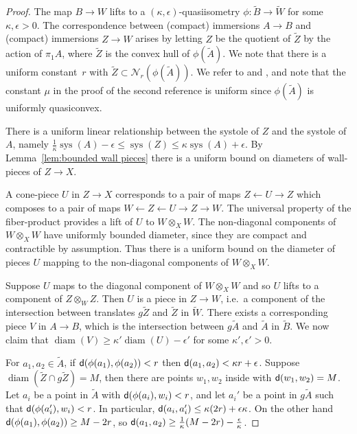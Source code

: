 \documentclass[12pt,oneside]{amsart}
\theoremstyle{definition}
\theoremstyle{definition}
\theoremstyle{remark}
\newcommand{\dist}{\textup{\textsf{d}}}
\DeclareMathOperator{\diam}{\text{diam}}
\newcommand{\neb}{\mathcal N}
\DeclareMathOperator{\sys}{\mathrm sys}
\begin{document}
\begin{proof}
The map $B\rightarrow W$ lifts to a $(\kappa,\epsilon)$-quasiisometry $\phi: \widetilde B\rightarrow \widetilde W$
for some $\kappa,\epsilon>0$.
%
The correspondence between (compact) immersions $A\rightarrow B$ and (compact) immersions $Z\rightarrow W$
arises by letting  $Z$ be the quotient of $\widetilde Z$ by the action of $\pi_1A$, where $\widetilde Z $ is the convex hull of $\phi(\widetilde A)$.
We note that there is a uniform constant~$r$ with $\widetilde Z\subset \neb_r(\phi(\widetilde A))$.
We refer to  \cite[Thm~2.28]{HaglundGraphProduct} and \cite[Prop~3.3]{SageevWiseCores},
and note that the constant $\mu$ in the proof of the second reference is uniform since $\phi(\widetilde A)$ is uniformly quasiconvex. 

There is a uniform linear relationship between the systole of $Z$ and the systole of $A$, namely $\frac {1}{\kappa} \sys(A)- \epsilon \leq \sys (Z)\leq \kappa\sys(A)+\epsilon$.
%
By Lemma~\ref{lem:bounded wall pieces} there is a uniform bound on diameters of wall-pieces of $Z\rightarrow X$.


A cone-piece $U$ in $Z\rightarrow X$
corresponds to a pair of maps $Z\leftarrow U \rightarrow Z$
which composes to a pair of maps $W\leftarrow Z \leftarrow U \rightarrow Z\rightarrow W$.
The universal property of the fiber-product provides a lift of $U$ to $W \otimes_X W$.
The non-diagonal components of $W\otimes_X W $ have
uniformly bounded diameter, since they are compact and contractible by assumption. Thus there is a uniform bound on the diameter of pieces $U$ mapping to the non-diagonal components of $W\otimes_X W $.

Suppose $U$ maps to the diagonal component of $W\otimes_X W$ and so $U$ lifts to a component of $Z\otimes_W Z$.
Then $U$ is a piece in $Z\rightarrow W$, i.e.\ a component of the intersection between translates $g\widetilde Z$ and $\widetilde Z$ in $\widetilde W$. 
There exists a corresponding piece $V$ in $A\to B$, which is the intersection between $g\widetilde A$ and $\widetilde A$ in $\widetilde B$. We now claim that $\diam(V)\geq \kappa'\diam(U) - \epsilon'$ for some $\kappa', \epsilon'>0$.

For $a_1,a_2\in \widetilde A$, if $\dist(\phi(a_1),\phi(a_2)) <r$
then $\dist(a_1,a_2)< \kappa r + \epsilon$.
Suppose $\diam(\widetilde Z\cap g\widetilde Z)=M$,
then there are points $w_1,w_2$ inside with $\dist(w_1,w_2)=M$.
Let $a_i$ be a point in $\widetilde A$
with $\dist(\phi(a_i),w_i) < r$, and let $a_i'$ be a point in $g\widetilde A$ such that $\dist(\phi(a_i'), w_i)<r$. In particular, $\dist(a_i, a_i')\leq \kappa(2r)+\epsilon \kappa$. 
On the other hand $\dist(\phi(a_1),\phi(a_2))\geq M-2r$, so $\dist(a_1,a_2)\geq \frac{1}{\kappa}(M-2r)-\frac{\epsilon}{\kappa}$. 


\end{proof}
\end{document}
